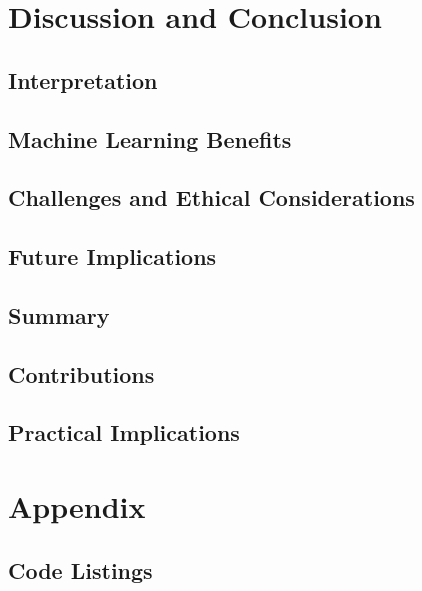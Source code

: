 \documentclass[draft,final]{thesisclass} %
\begin{document}
\chapter{Discussion and Conclusion}

\section{Interpretation}
\lipsum[1]

\section{Machine Learning Benefits}
\lipsum[1]

\section{Challenges and Ethical Considerations}
\lipsum[1]

\section{Future Implications}
\lipsum[1]

\section{Summary}
\lipsum[1]

\section{Contributions}
\lipsum[1]

\section{Practical Implications}
\lipsum[1]

\backmatter


\nocite{*}
\printbibliography

\printindex

\printglossaries


\chapter{Appendix}
\setcounter{page}{1}
\setcounter{chapter}{0}

\section{Code Listings}


\end{document}
